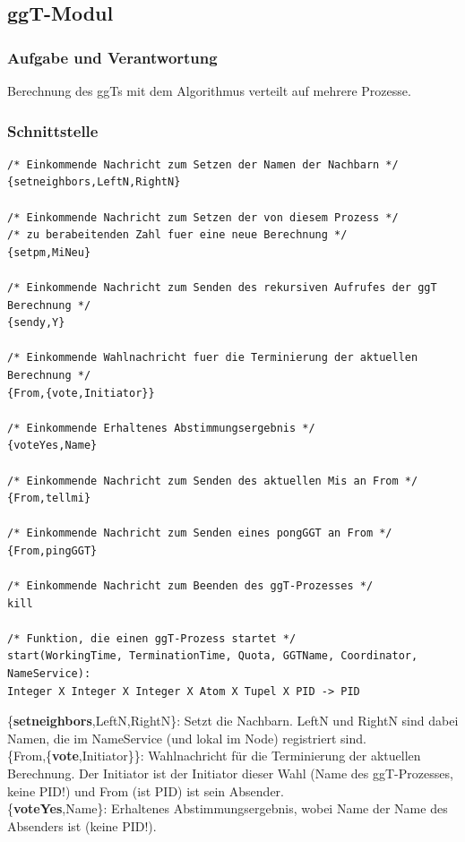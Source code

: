 \documentclass{article}
\begin{document}
\newpage

\subsection{ggT-Modul}
\subsubsection{Aufgabe und Verantwortung}
Berechnung des ggTs mit dem Algorithmus verteilt auf mehrere Prozesse.

\subsubsection{Schnittstelle}
\begin{lstlisting}
/* Einkommende Nachricht zum Setzen der Namen der Nachbarn */
{setneighbors,LeftN,RightN}

/* Einkommende Nachricht zum Setzen der von diesem Prozess */
/* zu berabeitenden Zahl fuer eine neue Berechnung */
{setpm,MiNeu}

/* Einkommende Nachricht zum Senden des rekursiven Aufrufes der ggT Berechnung */
{sendy,Y}

/* Einkommende Wahlnachricht fuer die Terminierung der aktuellen Berechnung */
{From,{vote,Initiator}}

/* Einkommende Erhaltenes Abstimmungsergebnis */
{voteYes,Name}

/* Einkommende Nachricht zum Senden des aktuellen Mis an From */
{From,tellmi}

/* Einkommende Nachricht zum Senden eines pongGGT an From */
{From,pingGGT}

/* Einkommende Nachricht zum Beenden des ggT-Prozesses */
kill

/* Funktion, die einen ggT-Prozess startet */
start(WorkingTime, TerminationTime, Quota, GGTName, Coordinator, NameService):
Integer X Integer X Integer X Atom X Tupel X PID -> PID
\end{lstlisting}
\{\textbf{setneighbors},LeftN,RightN\}: Setzt die Nachbarn. LeftN und RightN sind dabei Namen, die im NameService
(und lokal im Node) registriert sind.\\

\{From,\{\textbf{vote},Initiator\}\}: Wahlnachricht für die Terminierung der aktuellen Berechnung. Der Initiator ist der
Initiator dieser Wahl (Name des ggT-Prozesses, keine PID!) und From (ist PID) ist sein Absender.\\

\{\textbf{voteYes},Name\}: Erhaltenes Abstimmungsergebnis, wobei Name der Name des Absenders ist (keine PID!).\\
\end{document}
